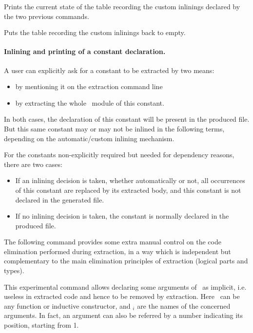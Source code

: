 \begin{description}
\item {}
{}

Prints the current state of the table recording the custom inlinings 
declared by the two previous commands. 

\item {}
{}

Puts the table recording the custom inlinings back to empty. 

\end{description}


\paragraph{Inlining and printing of a constant declaration.}

A user can explicitly ask for a constant to be extracted by two means:
\begin{itemize}
\item by mentioning it on the extraction command line
\item by extracting the whole \Coq\ module of this constant.
\end{itemize}
In both cases, the declaration of this constant will be present in the
produced file. 
But this same constant may or may not be inlined in the following
terms, depending on the automatic/custom inlining mechanism.  


For the constants non-explicitly required but needed for dependency
reasons, there are two cases: 
\begin{itemize}
\item If an inlining decision is taken, whether automatically or not,
all occurrences of this constant are replaced by its extracted body, and
this constant is not declared in the generated file.
\item If no inlining decision is taken, the constant is normally
  declared in the produced file. 
\end{itemize}


The following command provides some extra manual control on the
code elimination performed during extraction, in a way which
is independent but complementary to the main elimination
principles of extraction (logical parts and types).

\begin{description}
\item {}
 {}

This experimental command allows declaring some arguments of
\qualid\ as implicit, i.e. useless in extracted code and hence to
be removed by extraction. Here \qualid\ can be any function or
inductive constructor, and \ident$_i$ are the names of the concerned
arguments. In fact, an argument can also be referred by a number
indicating its position, starting from 1.
\end{description}

